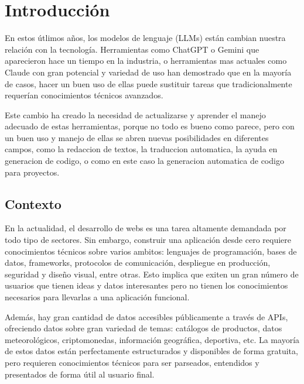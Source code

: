 

\cleardoublepage
\chapter{Introducción}
\label{chap:introduccion}

En estos útlimos años, los modelos de lenguaje (LLMs) están cambian nuestra relación con la tecnología. Herramientas como ChatGPT o Gemini que aparecieron hace un tiempo en la industria, o herramientas mas actuales como Claude con gran potencial y variedad de uso han demostrado que en la mayoría de casos, hacer un buen uso de ellas puede sustituir tareas que tradicionalmente requerían conocimientos técnicos avanzados.

Este cambio ha creado la necesidad de actualizarse y aprender el manejo adecuado de estas herramientas, porque no todo es bueno como parece, pero con un buen uso y manejo de ellas se abren nuevas posibilidades en diferentes campos, como la redaccion de textos, la traduccion automatica, la ayuda en generacion de codigo, o como en este caso la generacion automatica de codigo para proyectos. 



\section{Contexto}
\label{sec:contexto}

En la actualidad, el desarrollo de webs es una tarea altamente demandada por todo tipo de sectores.
Sin embargo, construir una aplicación desde cero requiere conocimientos técnicos sobre varios ambitos: lenguajes de programación, bases de datos, frameworks, protocolos de comunicación, despliegue en producción, seguridad y diseño visual, entre otras. Esto implica que exiten un gran número de usuarios que tienen ideas y datos interesantes pero no tienen los conocimientos necesarios para llevarlas a una aplicación funcional.

Además, hay gran cantidad de datos accesibles públicamente a través de APIs, ofreciendo datos sobre gran variedad de temas: catálogos de productos, datos meteorológicos, criptomonedas, información geográfica, deportiva, etc. La mayoría de estos datos están perfectamente estructurados y disponibles de forma gratuita, pero requieren conocimientos técnicos para ser parseados, entendidos y presentados de forma útil al usuario final.


